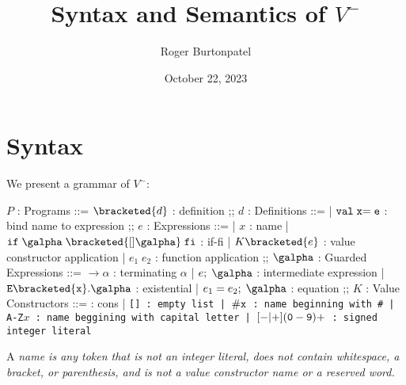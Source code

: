 \documentclass[]{article}
\title{Syntax and Semantics of $V^{-}$}
\author{Roger Burtonpatel}
\date{October 22, 2023}
\begin{document}
\maketitle

\section{Syntax}

We present a grammar of $V^{-}$: 

\bigskip


\begin{center}
    \begin{bnf}

    $P$ : \textsf{Programs} ::=
    $\bracketed{d}$ : definition
    ;;
    $d$ : \textsf{Definitions} ::=
    | $\tt{val} \; x  \tt{=} \; e$ : bind name to expression
    ;;
    $e$ : \textsf{Expressions} ::=
    | $x$ : name
    | $\tt{if} \; \galpha \; \bracketed{[] \galpha} \; \tt{fi}$ : if-fi 
    | $K \bracketed{e}$ : value constructor application 
    | $e_1 \; e_2$ : function application 
    ;;
    $\galpha$ : \textsf{Guarded Expressions} ::=  
    $\boldsymbol{\rightarrow}\alpha$ : terminating $\alpha$ 
    | $e; \; \galpha$ : intermediate expression 
    | $\tt{E} \bracketed{x} \tt{.} \galpha$ : existential 
    | $e_1 = e_2; \; \galpha$ : equation 
    ;;
    $K$ : \textsf{Value Constructors} ::=
    \cons : cons 
    | \tt{[]} : empty list 
    | $\tt{\#}x$ : name beginning with \tt{\#}
    | \tt{A-Z}$x$ : name beggining with capital letter
    | $[\tt{-}\vert\tt{+}](\tt{0}-\tt{9})+$ : signed integer literal 

    \end{bnf}
\end{center}

\bigskip 

A \it{name} is any token that is not an integer literal, 
does not contain whitespace, a bracket, or parenthesis, 
and is not a value constructor name or a reserved word.
\end{document}
